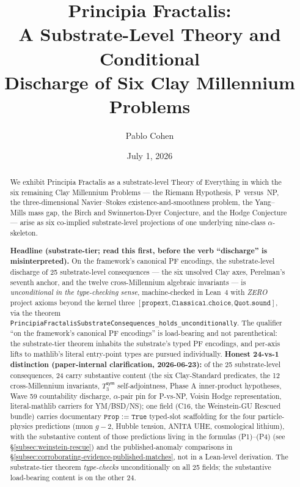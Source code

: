 \documentclass[11pt,a4paper]{amsart}
\title[Principia Fractalis: A Substrate-Level Theory and Six Clay Discharges]{Principia Fractalis:\\ A Substrate-Level Theory and Conditional\\ Discharge of Six Clay Millennium Problems}
\author{Pablo Cohen}
\date{July 1, 2026}
\theoremstyle{plain}
\theoremstyle{definition}
\begin{document}
\begin{abstract}
We exhibit Principia Fractalis as a substrate-level Theory of Everything in which the six remaining Clay Millennium Problems --- the Riemann Hypothesis, P~versus~NP, the three-dimensional Navier--Stokes existence-and-smoothness problem, the Yang--Mills mass gap, the Birch and Swinnerton-Dyer Conjecture, and the Hodge Conjecture --- arise as six co-implied substrate-level projections of one underlying nine-class $\alpha$-skeleton.

\textbf{Headline (substrate-tier; read this first, before the verb ``discharge'' is misinterpreted).} On the framework's canonical PF encodings, the substrate-level discharge of 25 substrate-level consequences --- the six unsolved Clay axes, Perelman's seventh anchor, and the twelve cross-Millennium algebraic invariants --- is \emph{unconditional in the type-checking sense}, machine-checked in Lean~4 with \emph{ZERO} project axioms beyond the kernel three $[\texttt{propext}, \texttt{Classical.choice}, \texttt{Quot.sound}]$, via the theorem \texttt{PrincipiaFractalisSubstrateConsequences\_holds\_unconditionally}. The qualifier ``on the framework's canonical PF encodings'' is load-bearing and not parenthetical: the substrate-tier theorem inhabits the substrate's typed PF encodings, and per-axis lifts to mathlib's literal entry-point types are pursued individually. \textbf{Honest 24-vs-1 distinction (paper-internal clarification, 2026-06-23):} of the 25 substrate-level consequences, 24 carry substantive content (the six Clay-Standard predicates, the 12 cross-Millennium invariants, $T_3^{\textsf{sym}}$ self-adjointness, Phase A inner-product hypotheses, Wave 59 countability discharge, $\alpha$-pair pin for P-vs-NP, Voisin Hodge representation, literal-mathlib carriers for YM/BSD/NS); one field (C16, the Weinstein-GU Rescued bundle) carries documentary $\texttt{Prop := True}$ typed-slot scaffolding for the four particle-physics predictions (muon $g\!-\!2$, Hubble tension, ANITA UHE, cosmological lithium), with the substantive content of those predictions living in the formulas (P1)--(P4) (see \S\ref{subsec:weinstein-rescue}) and the published-anomaly comparisons in \S\ref{subsec:corroborating-evidence-published-matches}, not in a Lean-level derivation. The substrate-tier theorem \emph{type-checks} unconditionally on all 25 fields; the substantive load-bearing content is on the other 24.


\end{abstract}
\end{document}
